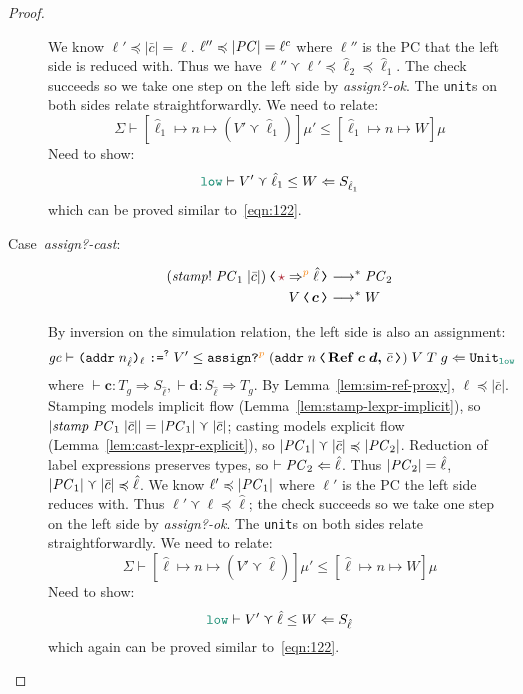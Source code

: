 \begin{proof}
\begin{description}
\[  \]
  We know $\ell' \preccurlyeq |\bar{c}| = \ell$. $\ell'' \preccurlyeq |\mathit{PC}| = \ell^c$ where $\ell''$
  is the PC that the left side is reduced with. Thus we have
  $\ell'' \curlyvee \ell' \preccurlyeq \hat{\ell}_2 \preccurlyeq \hat{\ell}_1$.
  The check succeeds so we take one step on the left side by \textit{assign?-ok}.
  The \texttt{unit}s on both sides relate straightforwardly. We need to relate:
  \[
  \Sigma \vdash [\hat{\ell}_1 \mapsto n \mapsto (V' \curlyvee \hat{\ell}_1)] \mu' \leq [\hat{\ell}_1 \mapsto n \mapsto W] \mu
  \]
  Need to show:
  \[
  \simrel{\low}{V' \curlyvee \hat{\ell}_1}{W}{S_{\hat{\ell}_1}}
  \]
  which can be proved similar to~\eqref{eqn:122}.

  \item[Case~\textit{assign?-cast}:]
  \begin{align}
  \cccast{(\mathit{stamp!}\;\PC_1\;|\bar{c}|)}{\unk \Rightarrow^{\bl{p}} \hat{\ell}} &\longrightarrow^{*} \PC_2 \\
  \cccast{V}{\bm{c}} &\longrightarrow^{*} W
  \end{align}

  By inversion on the simulation relation, the left side is also an assignment:
  \[
  \simrel{\gc}{\dynassign{\dynaddr{n_{\hat{\ell}}}{\ell}}{?}{V'}}{\ccassignproj{\left(\cccast{\ccaddr{n}}{\coerc{\refco{\bm{c}}{\bm{d}}}{\bar{c}}}\right)}{V}{T}{g}{p}}{\Unit_{\low}}
  \]
  where $\vdash \bm{c} : T_g \Rightarrow S_{\hat{\ell}}, \vdash \bm{d} : S_{\hat{\ell}} \Rightarrow T_g$.
  By Lemma~\ref{lem:sim-ref-proxy}, $\ell \preccurlyeq |\bar{c}|$.
  Stamping models implicit flow (Lemma~\ref{lem:stamp-lexpr-implicit}),
  so $|\mathit{stamp}\;\mathit{PC}_1\;|\bar{c}|| = |\mathit{PC}_1| \curlyvee |\bar{c}|$;
  casting models explicit flow (Lemma~\ref{lem:cast-lexpr-explicit}), so
  $|\mathit{PC}_1| \curlyvee |\bar{c}| \preccurlyeq |\mathit{PC}_2|$.
  Reduction of label expressions preserves types, so $\vdash \mathit{PC}_2 \Leftarrow \hat{\ell}$.
  Thus $|\mathit{PC}_2| = \hat{\ell}$, $|\mathit{PC}_1| \curlyvee |\bar{c}| \preccurlyeq \hat{\ell}$.
  We know $\ell' \preccurlyeq |\mathit{PC}_1|$ where $\ell'$ is the PC the left side reduces with.
  Thus $\ell' \curlyvee \ell \preccurlyeq \hat{\ell}$; the check succeeds so we take one
  step on the left side by \textit{assign?-ok}.
  The \texttt{unit}s on both sides relate straightforwardly. We need to relate:
  \[
  \Sigma \vdash [\hat{\ell} \mapsto n \mapsto (V' \curlyvee \hat{\ell})] \mu' \leq [\hat{\ell} \mapsto n \mapsto W] \mu
  \]
  Need to show:
  \[
  \simrel{\low}{V' \curlyvee \hat{\ell}}{W}{S_{\hat{\ell}}}
  \]
  which again can be proved similar to~\eqref{eqn:122}.

  \end{description}
\end{proof}

